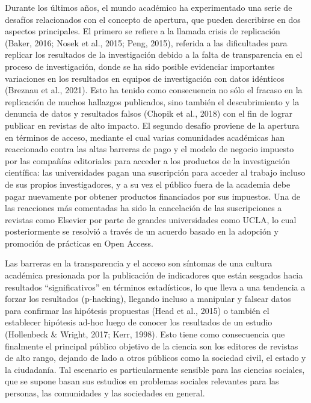 \documentclass[
  letterpaper,
  DIV=11,
  numbers=noendperiod]{scrreprt}
\begin{document}
Durante los últimos años, el mundo académico ha experimentado una serie
de desafíos relacionados con el concepto de apertura, que pueden
describirse en dos aspectos principales. El primero se refiere a la
llamada crisis de replicación (Baker, 2016; Nosek et al., 2015; Peng,
2015), referida a las dificultades para replicar los resultados de la
investigación debido a la falta de transparencia en el proceso de
investigación, donde se ha sido posible evidenciar importantes
variaciones en los resultados en equipos de investigación con datos
idénticos (Breznau et al., 2021). Esto ha tenido como consecuencia no
sólo el fracaso en la replicación de muchos hallazgos publicados, sino
también el descubrimiento y la denuncia de datos y resultados falsos
(Chopik et al., 2018) con el fin de lograr publicar en revistas de alto
impacto. El segundo desafío proviene de la apertura en términos de
acceso, mediante el cual varias comunidades académicas han reaccionado
contra las altas barreras de pago y el modelo de negocio impuesto por
las compañías editoriales para acceder a los productos de la
investigación científica: las universidades pagan una suscripción para
acceder al trabajo incluso de sus propios investigadores, y a su vez el
público fuera de la academia debe pagar nuevamente por obtener productos
financiados por sus impuestos. Una de las reacciones más comentadas ha
sido la cancelación de las suscripciones a revistas como Elsevier por
parte de grandes universidades como UCLA, lo cual posteriormente se
resolvió a través de un acuerdo basado en la adopción y promoción de
prácticas en Open Access.

Las barreras en la transparencia y el acceso son síntomas de una cultura
académica presionada por la publicación de indicadores que están
sesgados hacia resultados ``significativos'' en términos estadísticos,
lo que lleva a una tendencia a forzar los resultados (p-hacking),
llegando incluso a manipular y falsear datos para confirmar las
hipótesis propuestas (Head et al., 2015) o también el establecer
hipótesis ad-hoc luego de conocer los resultados de un estudio
(Hollenbeck \& Wright, 2017; Kerr, 1998). Esto tiene como consecuencia
que finalmente el principal público objetivo de la ciencia son los
editores de revistas de alto rango, dejando de lado a otros públicos
como la sociedad civil, el estado y la ciudadanía. Tal escenario es
particularmente sensible para las ciencias sociales, que se supone basan
sus estudios en problemas sociales relevantes para las personas, las
comunidades y las sociedades en general.
\end{document}
